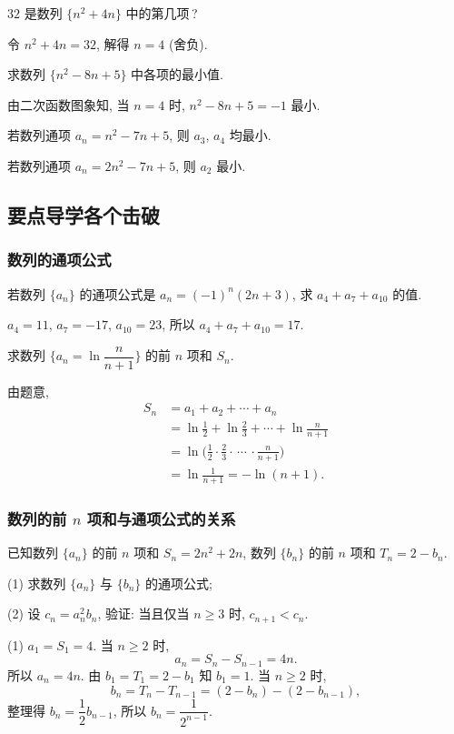 \begin{exercise}
    $32$ 是数列 $\{n^2 +4n\}$ 中的第几项\,?
\end{exercise}
\beginsolution
    令 $n^2 +4n= 32$, 解得 $n=4$ (舍负).
\endsolution

\begin{exercise}
    求数列 $\{n^2 -8n+5\}$ 中各项的最小值.
\end{exercise}
\beginsolution
    由二次函数图象知, 当 $n=4$ 时, $n^2 -8n+5= -1$ 最小.

    \varexercise 若数列通项 $a_n= n^2 -7n+5$, 则 $a_3$, $a_4$ 均最小.

    \varexercise 若数列通项 $a_n= 2n^2 -7n+5$, 则 $a_2$ 最小.
\endsolution

\subsection{要点导学\quad 各个击破}
\subsubsection{数列的通项公式}
\begin{example}
    若数列 $\{a_n\}$ 的通项公式是 $a_n =(-1)^n (2n+3)$, 求 $a_4 +a_7 +a_{10}$ 的值.
\end{example}
\beginsolution
    $a_4= 11$, $a_7=-17$, $a_{10}= 23$, 所以 $a_4+a_7+a_{10}= 17$.
\endsolution

\lianxi
\begin{exercise}[s]
    求数列 $\biggl\{a_n= \ln\dfrac{n}{n+1}\biggr\}$ 的前 $n$ 项和 $S_n$.
\end{exercise}
\beginsolution
    由题意,
    \[\begin{aligned}
        S_n
        &= a_1+a_2+\cdots +a_n\\
        &= \ln\frac12+ \ln\frac23+ \cdots + \ln\frac{n}{n+1}\\
        &= \ln\biggl(\frac12\cdot \frac23\cdot\,\cdots\,\cdot \frac{n}{n+1}\biggr)\\
        &= \ln\frac1{n+1}= -\ln(n+1).
    \end{aligned}\]
\endsolution

\subsubsection{数列的前 $n$ 项和与通项公式的关系}
\begin{example}
    已知数列 $\{a_n\}$ 的前 $n$ 项和 $S_n=2n^2 +2n$, 数列 $\{b_n\}$ 的前 $n$ 项和 $T_n =2-b_n$.
    
    (1) 求数列 $\{a_n\}$ 与 $\{b_n\}$ 的通项公式;
    
    (2) 设 $c_n=a_n^2b_ n$, 验证: 当且仅当 $n\geqslant 3$ 时, $c_{n+1}<c_n$.
\end{example}
\beginsolution
    (1) $a_1= S_1= 4$. 当 $n\geqslant 2$ 时, 
    \[a_n= S_n-S_{n-1}= 4n.\]
    所以 $a_n=4n$. 由 $b_1= T_1= 2-b_1$ 知 $b_1=1$. 当 $n\geqslant 2$ 时, 
    \[b_n= T_n-T_{n-1}= (2-b_n)- (2-b_{n-1}),\]
    整理得 $b_n= \dfrac12 b_{n-1}$, 所以 $b_n= \dfrac1{2^{n-1}}$.

